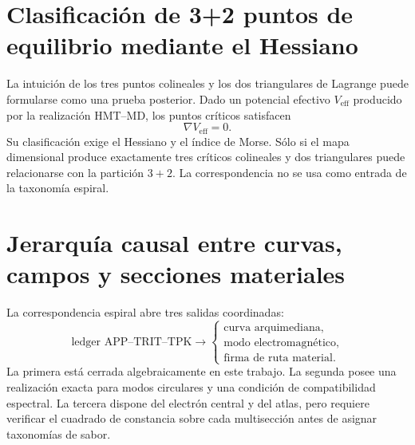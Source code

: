\section{Clasificación de 3+2 puntos de equilibrio mediante el Hessiano}

La intuición de los tres puntos colineales y los dos triangulares de Lagrange
puede formularse como una prueba posterior. Dado un potencial efectivo
\(V_{\mathrm{eff}}\) producido por la realización HMT--MD, los puntos críticos
satisfacen
\[
 \nabla V_{\mathrm{eff}}=0.
\]
Su clasificación exige el Hessiano y el índice de Morse. Sólo si el mapa
dimensional produce exactamente tres críticos colineales y dos triangulares
puede relacionarse con la partición \(3+2\). La correspondencia no se usa
como entrada de la taxonomía espiral.

\section{Jerarquía causal entre curvas, campos y secciones materiales}

La correspondencia espiral abre tres salidas coordinadas:
\[
 \text{ledger APP--TRIT--TPK}
 \longrightarrow
 \begin{cases}
 \text{curva arquimediana},\\
 \text{modo electromagnético},\\
 \text{firma de ruta material}.
 \end{cases}
\]
La primera está cerrada algebraicamente en este trabajo. La segunda posee
una realización exacta para modos circulares y una condición de
compatibilidad espectral. La tercera dispone del electrón central y del
atlas, pero requiere verificar el cuadrado de constancia sobre cada
multisección antes de asignar taxonomías de sabor.
